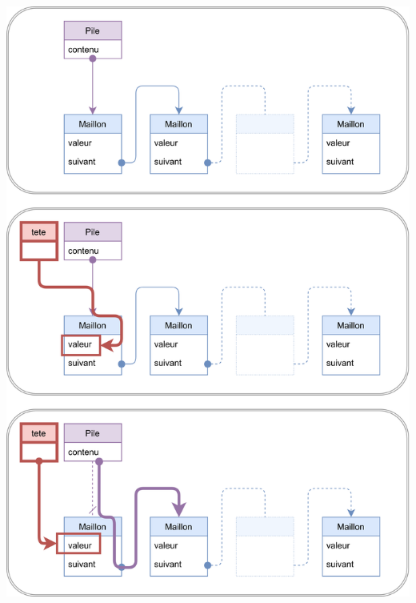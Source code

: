 \documentclass[a4paper,17pt]{extarticle}
\let\origfigure\figure
\let\endorigfigure\endfigure
\renewenvironment{figure}[1][2] {
    \expandafter\origfigure\expandafter[H]
} {
    \endorigfigure
}
\begin{document}
    \begin{figure}
\centering
\includegraphics{img-depiler.png}
\caption{Algorithme pour depiler}
\end{figure}
\end{document}
